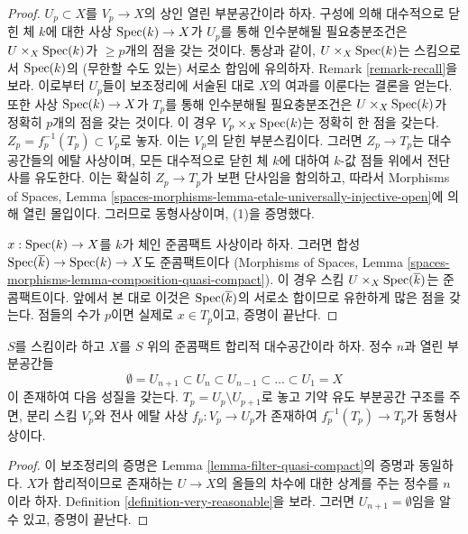\begin{proof}
\medskip\noindent
$U_p \subset X$를 $V_p \to X$의 상인 열린 부분공간이라 하자.
구성에 의해 대수적으로 닫힌 체 $k$에 대한 사상
$\mathop{\mathrm{Spec}}(k) \to X$가 $U_p$를 통해 인수분해될 필요충분조건은
$U \times_X \mathop{\mathrm{Spec}}(k)$가 $\geq p$개의 점을 갖는 것이다.
통상과 같이, $U \times_X \mathop{\mathrm{Spec}}(k)$는 스킴으로서
$\mathop{\mathrm{Spec}}(k)$의 (무한할 수도 있는) 서로소 합임에 유의하자.
Remark \ref{remark-recall}을 보라. 이로부터 $U_p$들이 보조정리에
서술된 대로 $X$의 여과를 이룬다는 결론을 얻는다.
또한 사상 $\mathop{\mathrm{Spec}}(k) \to X$가 $T_p$를 통해 인수분해될
필요충분조건은 $U \times_X \mathop{\mathrm{Spec}}(k)$가 정확히 $p$개의 점을 갖는
것이다. 이 경우 $V_p \times_X \mathop{\mathrm{Spec}}(k)$는 정확히 한 점을 갖는다.
$Z_p = f_p^{-1}(T_p) \subset V_p$로 놓자. 이는 $V_p$의 닫힌
부분스킴이다. 그러면 $Z_p \to T_p$는 대수공간들의 에탈 사상이며,
모든 대수적으로 닫힌 체 $k$에 대하여 $k$-값 점들 위에서 전단사를
유도한다. 이는 확실히 $Z_p \to T_p$가 보편 단사임을 함의하고,
따라서 Morphisms of Spaces, Lemma
\ref{spaces-morphisms-lemma-etale-universally-injective-open}에 의해
열린 몰입이다. 그러므로 동형사상이며, (1)을 증명했다.

\medskip\noindent
$x : \mathop{\mathrm{Spec}}(k) \to X$를 $k$가 체인 준콤팩트 사상이라 하자.
그러면 합성 $\mathop{\mathrm{Spec}}(\overline{k}) \to \mathop{\mathrm{Spec}}(k) \to X$도 준콤팩트이다
(Morphisms of Spaces, Lemma
\ref{spaces-morphisms-lemma-composition-quasi-compact}).
이 경우 스킴 $U \times_X \mathop{\mathrm{Spec}}(\overline{k})$는 준콤팩트이다.
앞에서 본 대로 이것은 $\mathop{\mathrm{Spec}}(\overline{k})$의 서로소 합이므로
유한하게 많은 점을 갖는다. 점들의 수가 $p$이면 실제로
$x \in T_p$이고, 증명이 끝난다.
\end{proof}

\begin{lemma}
\label{lemma-filter-reasonable}
$S$를 스킴이라 하고 $X$를 $S$ 위의 준콤팩트 합리적 대수공간이라 하자.
정수 $n$과 열린 부분공간들
$$
\emptyset = U_{n + 1} \subset
U_n \subset U_{n - 1} \subset \ldots \subset U_1 = X
$$
이 존재하여 다음 성질을 갖는다. $T_p = U_p \setminus U_{p + 1}$로
놓고 기약 유도 부분공간 구조를 주면, 분리 스킴 $V_p$와 전사 에탈
사상 $f_p : V_p \to U_p$가 존재하여
$f_p^{-1}(T_p) \to T_p$가 동형사상이다.
\end{lemma}

\begin{proof}
이 보조정리의 증명은 Lemma \ref{lemma-filter-quasi-compact}의 증명과
동일하다. $X$가 합리적이므로 존재하는 $U \to X$의 올들의 차수에 대한
상계를 주는 정수를 $n$이라 하자. Definition
\ref{definition-very-reasonable}을 보라. 그러면
$U_{n + 1} = \emptyset$임을 알 수 있고, 증명이 끝난다.
\end{proof}

